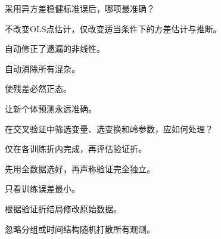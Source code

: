 \par\addvspace{6pt}\noindent\begin{minipage}{\linewidth}


采用异方差稳健标准误后，哪项最准确？


\begin{choices}

\item 不改变OLS点估计，仅改变适当条件下的方差估计与推断。

\item 自动修正了遗漏的非线性。

\item 自动消除所有混杂。

\item 使残差必然正态。

\item 让新个体预测永远准确。

\end{choices}

\end{minipage}\par\vspace{4pt}

\par\addvspace{6pt}\noindent\begin{minipage}{\linewidth}


在交叉验证中筛选变量、选变换和岭参数，应如何处理？


\begin{choices}

\item 仅在各训练折内完成，再评估验证折。

\item 先用全数据选好，再声称验证完全独立。

\item 只看训练误差最小。

\item 根据验证折结局修改原始数据。

\item 忽略分组或时间结构随机打散所有观测。

\end{choices}

\end{minipage}\par\vspace{4pt}

